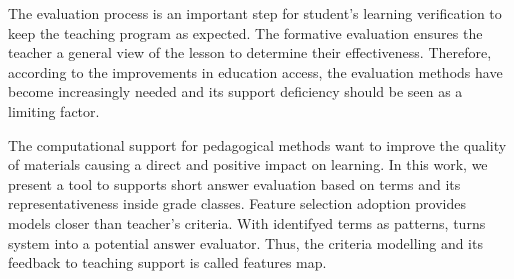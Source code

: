 
\begin{comment}
Automatic evaluation of free-text answers was introduced to relieve teacher overload problems supporting your evaluation methods. In the end of nineties, with student's discourse verification, arise some works based on context analysis for short text. Meanwhile, essay evaluation has focused in writting style and theme definition. Accordingly, while both are textual activities, evaluation criteria of short text answers need to be closer of teacher correction models.

In this work, we present a tool for feature selection based on term frequency and its class representativity. The dimensionality reduction provide evaluation models more similar to teacher correction criteria. With identification of answers elements, this system builds a visualization structure called features map.

Therefore, features map aims to present all key contents selected for tutor, detailling his answers database. As a consequence of summarization for answer sets, we improve the classification performance. This summaries will be send to students as question's feedback, helping with mutual comprehension about the content. Hopefully, this tool enable teachers and students to organize talks on marked answers for discussion of results and provide collaborative analysis.

\end{comment}
The evaluation process is an important step for student's learning verification to keep the teaching program as expected. The formative evaluation ensures the teacher a general view of the lesson to determine their effectiveness. Therefore, according to the improvements in education access, the evaluation methods have become increasingly needed and its support deficiency should be seen as a limiting factor.

The computational support for pedagogical methods want to improve the quality of materials causing a direct and positive impact on learning. In this work, we present a tool to supports short answer evaluation based on terms and its representativeness inside grade classes. Feature selection adoption provides models closer than teacher's criteria. With identifyed terms as patterns, turns system into a potential answer evaluator. Thus, the criteria modelling and its feedback to teaching support is called features map.

